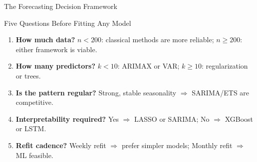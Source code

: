 \documentclass[aspectratio=169, 10pt]{beamer}
\begin{document}
\begin{frame}{The Forecasting Decision Framework}
  \begin{definitionbox}{Five Questions Before Fitting Any Model}
    {\small
    \begin{enumerate}\setlength{\itemsep}{3pt}
      \item \textbf{How much data?}
            $n < 200$: classical methods are more reliable;
            $n \geq 200$: either framework is viable.
      \item \textbf{How many predictors?}
            $k < 10$: ARIMAX or VAR; $k \geq 10$: regularization or trees.
      \item \textbf{Is the pattern regular?}
            Strong, stable seasonality $\Rightarrow$ SARIMA/ETS are competitive.
      \item \textbf{Interpretability required?}
            Yes $\Rightarrow$ LASSO or SARIMA; No $\Rightarrow$ XGBoost or LSTM.
      \item \textbf{Refit cadence?}
            Weekly refit $\Rightarrow$ prefer simpler models; Monthly refit $\Rightarrow$ ML feasible.
    \end{enumerate}
    }
  \end{definitionbox}
  \vspace{0.1cm}
  \\[3pt]
\end{frame}
\end{document}
